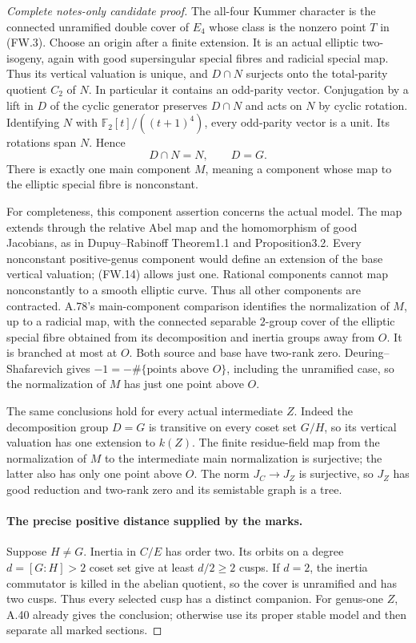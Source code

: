 \begin{proof}[Complete notes-only candidate proof]
The all-four Kummer character is the connected unramified double
cover of \(E_4\) whose class is the nonzero point \(T\) in
(FW.3). Choose an origin after a finite extension. It is an actual
elliptic two-isogeny, again with good supersingular special fibres
and radicial special map. Thus its vertical valuation is unique,
and \(D\cap N\) surjects onto the total-parity quotient \(C_2\)
of \(N\). In particular it contains an odd-parity vector.
Conjugation by a lift in \(D\) of the cyclic generator preserves
\(D\cap N\) and acts on \(N\) by cyclic rotation. Identifying
\(N\) with \(\mathbb F_2[t]/((t+1)^4)\), every odd-parity
vector is a unit. Its rotations span \(N\). Hence
\[
                         D\cap N=N,\qquad D=G.         \tag{FW.14}
\]
There is exactly one main component \(M\), meaning a component
whose map to the elliptic special fibre is nonconstant.

For completeness, this component assertion concerns the actual
model. The map extends through the relative Abel map and the
homomorphism of good Jacobians, as in Dupuy--Rabinoff Theorem1.1
and Proposition3.2. Every nonconstant positive-genus component
would define an extension of the base vertical valuation; (FW.14)
allows just one. Rational components cannot map nonconstantly to
a smooth elliptic curve. Thus all other components are contracted.
A.78's main-component comparison identifies the normalization of
\(M\), up to a radicial map, with the connected separable
\(2\)-group cover of the elliptic special fibre obtained from
its decomposition and inertia groups away from \(O\). It is
branched at most at \(O\). Both source and base have two-rank
zero. Deuring--Shafarevich gives
\(-1=-\#\{\text{points above }O\}\), including the unramified
case, so the normalization of \(M\) has just one point above
\(O\).

The same conclusions hold for every actual intermediate \(Z\).
Indeed the decomposition group \(D=G\) is transitive on every
coset set \(G/H\), so its vertical valuation has one extension
to \(k(Z)\). The finite residue-field map from the normalization
of \(M\) to the intermediate main normalization is surjective;
the latter also has only one point above \(O\). The norm
\(J_C\to J_Z\) is surjective, so \(J_Z\) has good reduction
and two-rank zero and its semistable graph is a tree.

\paragraph{The precise positive distance supplied by the marks.}
Suppose \(H\ne G\). Inertia in \(C/E\) has order two.
Its orbits on a degree \(d=[G:H]>2\) coset set give at least
\(d/2\ge2\) cusps. If \(d=2\), the inertia commutator is
killed in the abelian quotient, so the cover is unramified and
has two cusps. Thus every selected cusp has a distinct companion.
For genus-one \(Z\), A.40 already gives the conclusion; otherwise
use its proper stable model and then separate all marked sections.


\end{proof}
